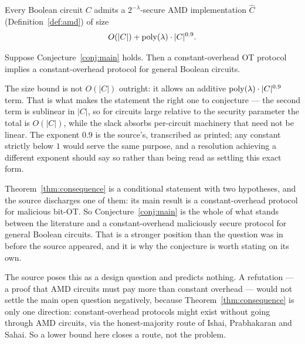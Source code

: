\documentclass{aicr-conjecture}
\begin{document}
\begin{conjecture}\label{conj:main}
Every Boolean circuit $C$ admits a $2^{-\lambda}$-secure AMD
implementation $\widehat{C}$ (Definition~\ref{def:amd}) of size
\[
  O(|C|) + \mathrm{poly}(\lambda) \cdot |C|^{0.9}.
\]
\end{conjecture}

\begin{theorem}
  \label{thm:consequence}
Suppose Conjecture~\ref{conj:main} holds. Then a constant-overhead OT
protocol implies a constant-overhead protocol for general Boolean
circuits.
\end{theorem}

\begin{remark}
The size bound is not $O(|C|)$ outright: it allows an additive
$\mathrm{poly}(\lambda) \cdot |C|^{0.9}$ term. That is what makes the statement
the right one to conjecture --- the second term is sublinear in $|C|$, so
for circuits large relative to the security parameter the total is
$O(|C|)$, while the slack absorbs per-circuit machinery that need not be
linear. The exponent $0.9$ is the source's, transcribed as printed; any
constant strictly below $1$ would serve the same purpose, and a
resolution achieving a different exponent should say so rather than being
read as settling this exact form.
\end{remark}

\begin{remark}
Theorem~\ref{thm:consequence} is a conditional statement with two
hypotheses, and the source discharges one of them: its main result is a
constant-overhead protocol for malicious bit-OT\@. So
Conjecture~\ref{conj:main} is the whole of what stands between the
literature and a constant-overhead maliciously secure protocol for
general Boolean circuits. That is a stronger position than the question
was in before the source appeared, and it is why the conjecture is worth
stating on its own.
\end{remark}

\begin{remark}\label{rem:direction}
The source poses this as a design question and predicts nothing. A
refutation --- a proof that AMD circuits must pay more than constant
overhead --- would not settle the main open question negatively, because
Theorem~\ref{thm:consequence} is only one direction: constant-overhead
protocols might exist without going through AMD circuits, via the
honest-majority route of Ishai, Prabhakaran and Sahai. So a lower bound
here closes a route, not the problem.
\end{remark}
\end{document}
